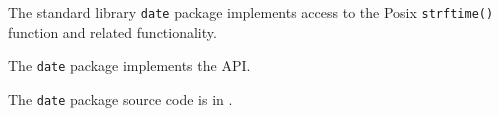 

The standard library {\tt date} package implements  
access to the Posix {\tt strftime()} function and related functionality.

The {\tt date} package implements the  API.

The {\tt date} package source code is in .

